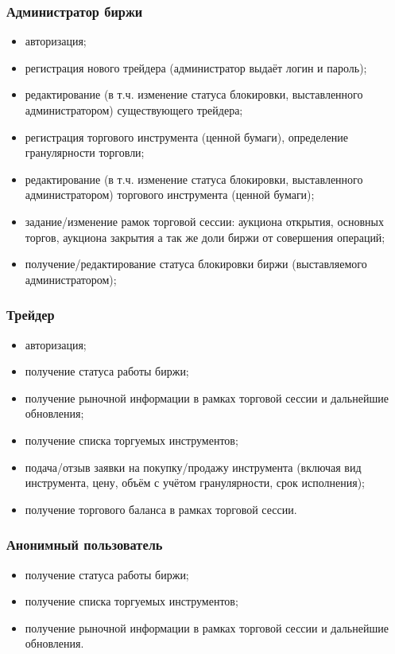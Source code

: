 \documentclass[a4paper, 12pt]{article}        %
\begin{document}
\subsubsection{Администратор биржи}
\begin{itemize}
\item авторизация;
\item регистрация нового трейдера (администратор выдаёт логин и пароль);
\item редактирование (в т.ч. изменение статуса блокировки, выставленного администратором) существующего трейдера;
\item регистрация торгового инструмента (ценной бумаги), определение гранулярности торговли;
\item редактирование (в т.ч. изменение статуса блокировки, выставленного администратором) торгового инструмента (ценной бумаги);
\item задание/изменение рамок торговой сессии: аукциона открытия, основных торгов, аукциона закрытия а так же доли биржи от совершения операций;
\item получение/редактирование статуса блокировки биржи (выставляемого администратором);
\end{itemize}

\subsubsection{Трейдер}
\begin{itemize}
\item авторизация;
\item получение статуса работы биржи;
\item получение рыночной информации в рамках торговой сессии и дальнейшие обновления;
\item получение списка торгуемых инструментов;
\item подача/отзыв заявки на покупку/продажу инструмента (включая вид инструмента, цену, объём с учётом гранулярности, срок исполнения);
\item получение торгового баланса в рамках торговой сессии.
\end{itemize}

\subsubsection{Анонимный пользователь}
\begin{itemize}
\item получение статуса работы биржи;
\item получение списка торгуемых инструментов;
\item получение рыночной информации в рамках торговой сессии и дальнейшие обновления.
\end{itemize}
\end{document}
